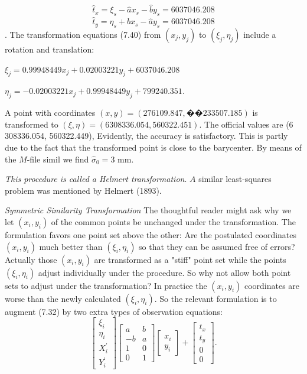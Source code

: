 \begin{equation*}
\hat{t}_x = \xi_s - \hat{a}x_s - \hat{b}y_s = 6 037 046.208
\end{equation*}
\begin{equation*}
\hat{t}_y = \eta_s + \hat{b}x_s - \hat{a}y_s = 6 037 046.208
\end{equation*}.
The transformation equations (7.40) from $(x_j, y_j)$ to $(\xi_j, \eta_j)$ include a rotation and translation:
\par $\xi_j = 0.999 484 49 x_j + 0.020 032 21 y_j + 6 037 046.208$
\par $\eta_j = -0.020 032 21 x_j + 0.999 484 49 y_j + 799 240.351.$
\par\noindent
A point with coordinates $(x, y) = (276 109.847, �� 233 507.185)$ is transformed to $(\xi, \eta) =(6308 336.054, 560322.451)$. The official values are (6 308336.054, 560322.449), Evidently, the accuracy is satisfactory. This is partly due to the fact that the transformed point is close to the barycenter. By means of the $M$-file simil we find $\hat{\sigma}_0 = 3$ mm.
\par
\emph{This procedure is called a Helmert transformation}. $A$ similar least-squares problem was mentioned by Helmert (1893).
\par\noindent
\emph{Symmetric Similarity Transformation} The thoughtful reader might ask why we let $(x_i, y_i)$ of the common points be unchanged under the transformation. The formulation favors one point set above the other: Are the postulated coordinates $(x_i, y_i)$ much better than $(\xi_i, \eta_i)$ so that they can be assumed free of errors? Actually those $(x_i, y_i)$ are transformed as a "stiff" point set while the points $(\xi_i, \eta_i)$ adjust individually under the procedure. So why not allow both point sets to adjust under the transformation? In practice the $(x_i, y_i)$ coordinates are worse than the newly calculated $(\xi_i, \eta_i)$. So the relevant formulation is to augment (7.32) by two extra types of observation equations:
\begin{equation}
\begin{bmatrix}
\xi_i\\
\eta_i\\
X_{i}^{'}\\
Y_{i}^{'}
\end{bmatrix}
\begin{bmatrix}
a  & b\\
-b & a\\
1 & 0\\
0 & 1
\end{bmatrix}
\begin{bmatrix}
x_i\\
y_i
\end{bmatrix}
+
\begin{bmatrix}
t_x\\
t_y\\
0\\
0
\end{bmatrix}.
\end{equation}
